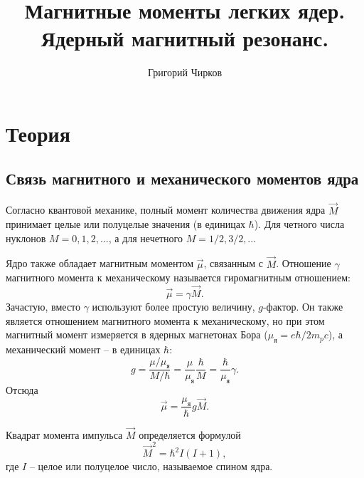 \documentclass[12pt,a4paper]{article}
\title{Магнитные моменты легких ядер. Ядерный магнитный резонанс.}
\author{Григорий Чирков}
\begin{document}
\maketitle

\section{Теория}
\subsection{Связь магнитного и механического моментов ядра}

Согласно квантовой механике, полный момент количества движения ядра $\vec{M}$ принимает целые или полуцелые значения (в единицах $\hbar$). Для четного числа нуклонов $M = 0, 1, 2, ... $, а для нечетного $M = 1/2, 3/2, ... $ 

Ядро также обладает магнитным моментом $\vec{\mu}$, связанным с $\vec{M}$. Отношение $\gamma$ магнитного момента к механическому называется гиромагнитным отношением:
\begin{equation}
\vec{\mu} = \gamma \vec{M}.
\end{equation}
Зачастую, вместо $\gamma$ используют более простую величину, $g$-фактор. Он также является отношением магнитного момента к механическому, но при этом магнитный момент измеряется в ядерных магнетонах Бора ($\mu_\text{я} = e \hbar / 2 m_p c$), а механический момент -- в единицах $\hbar$:
\begin{equation}
g = \frac{\mu / \mu _\text{я}}{M/\hbar} = \frac{\mu}{\mu_\text{я}} \frac{\hbar}{M} = \frac{\hbar}{\mu_\text{я}} \gamma.
\end{equation}
Отсюда 
\begin{equation} \label{mu}
\vec{\mu} = \frac{\mu_\text{я}}{\hbar} g \vec{M}.
\end{equation}

Квадрат момента импульса $\vec{M}$ определяется формулой 
\begin{equation}
\vec{M}^2 = \hbar^2 I (I+1),
\end{equation}
где $I$ -- целое или полуцелое число, называемое спином ядра.
\end{document}
